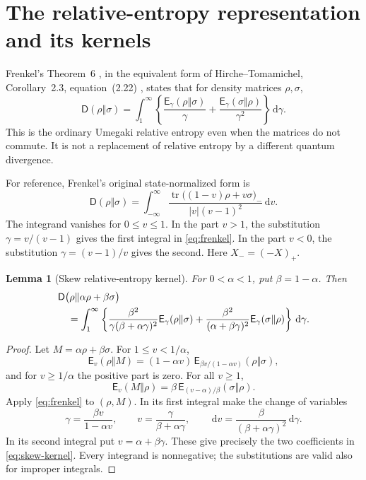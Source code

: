 \documentclass[11pt]{article}
\numberwithin{equation}{section}
\newtheorem{lemma}[theorem]{Lemma}
\theoremstyle{remark}
\DeclareMathOperator{\tr}{tr}
\newcommand{\rel}{\mathsf D}
\newcommand{\hs}{\mathsf E}
\newcommand{\dd}{\,\mathrm d}
\begin{document}
\section{The relative-entropy representation and its kernels}
\label{sec:representation}

Frenkel's Theorem~6 \cite{Frenkel}, in the equivalent form of
Hirche--Tomamichel, Corollary~2.3, equation~(2.22) \cite{HT}, states that
for density matrices $\rho,\sigma$,
\begin{equation}
 \rel(\rho\Vert\sigma)
  =\int_1^\infty
    \left\{\frac{\hs_\gamma(\rho\Vert\sigma)}{\gamma}
           +\frac{\hs_\gamma(\sigma\Vert\rho)}{\gamma^2}
    \right\}\dd\gamma.
 \label{eq:frenkel}
\end{equation}
This is the ordinary Umegaki relative entropy even when the matrices do
not commute. It is not a replacement of relative entropy by a different
quantum divergence.

For reference, Frenkel's original state-normalized form is
\[
 \rel(\rho\Vert\sigma)=
 \int_{-\infty}^{\infty}
 \frac{\tr\bigl((1-v)\rho+v\sigma\bigr)_-}{|v|(v-1)^2}\dd v.
\]
The integrand vanishes for $0\le v\le1$. In the part $v>1$, the
substitution $\gamma=v/(v-1)$ gives the first integral in
\eqref{eq:frenkel}. In the part $v<0$, the substitution
$\gamma=(v-1)/v$ gives the second. Here $X_-=(-X)_+$.

\begin{lemma}[Skew relative-entropy kernel]
\label{lem:skew}
For $0<\alpha<1$, put $\beta=1-\alpha$. Then
\begin{align}
 &\rel\bigl(\rho\Vert\alpha\rho+\beta\sigma\bigr)\notag\\
 &\quad=\int_1^\infty\left\{
 \frac{\beta^2}{\gamma(\beta+\alpha\gamma)^2}
       \hs_\gamma(\rho\Vert\sigma)
 +\frac{\beta^2}{(\alpha+\beta\gamma)^2}
       \hs_\gamma(\sigma\Vert\rho)
 \right\}\dd\gamma.
 \label{eq:skew-kernel}
\end{align}
\end{lemma}
\begin{proof}
Let $M=\alpha\rho+\beta\sigma$. For $1\le v<1/\alpha$,
\[
 \hs_v(\rho\Vert M)
   =(1-\alpha v)\,
     \hs_{\beta v/(1-\alpha v)}(\rho\Vert\sigma),
\]
and for $v\ge1/\alpha$ the positive part is zero. For all $v\ge1$,
\[
 \hs_v(M\Vert\rho)
   =\beta\,\hs_{(v-\alpha)/\beta}(\sigma\Vert\rho).
\]
Apply \eqref{eq:frenkel} to $(\rho,M)$. In its first integral make the
change of variables
\[
 \gamma=\frac{\beta v}{1-\alpha v},\qquad
 v=\frac{\gamma}{\beta+\alpha\gamma},\qquad
 \dd v=\frac{\beta}{(\beta+\alpha\gamma)^2}\dd\gamma.
\]
In its second integral put $v=\alpha+\beta\gamma$.
These give precisely the two coefficients in \eqref{eq:skew-kernel}.
Every integrand is nonnegative; the substitutions are valid also for
improper integrals.
\end{proof}
\end{document}
